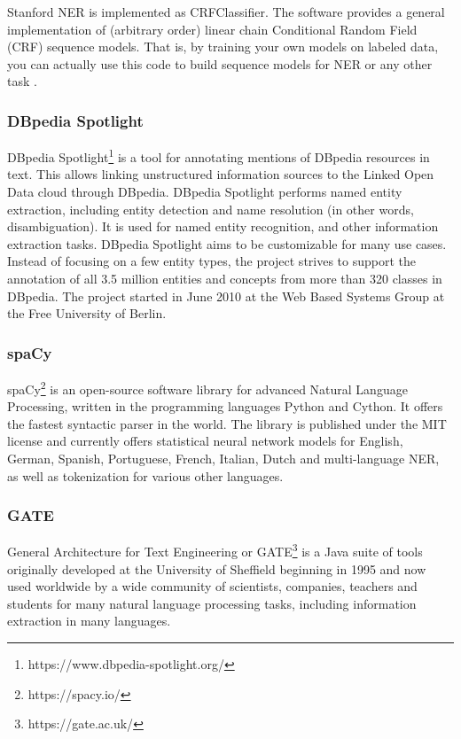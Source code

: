 \documentclass[thesis=M,english]{FITthesis}[2018/05/30]
\begin{document}
Stanford NER is implemented as CRFClassifier. The software provides a general implementation of (arbitrary order) linear chain Conditional Random Field (CRF) sequence models. That is, by training your own models on labeled data, you can actually use this code to build sequence models for NER or any other task \cite{article:StanfordNER}.

\subsubsection{DBpedia Spotlight}\label{DBpedia Spotlight}
DBpedia Spotlight\footnote{https://www.dbpedia-spotlight.org/} \cite{wiki:DBpediaSpotlight} is a tool for annotating mentions of DBpedia resources in text. This allows linking unstructured information sources to the Linked Open Data cloud through DBpedia. DBpedia Spotlight performs named entity extraction, including entity detection and name resolution (in other words, disambiguation). It is used for named entity recognition, and other information extraction tasks. DBpedia Spotlight aims to be customizable for many use cases. Instead of focusing on a few entity types, the project strives to support the annotation of all 3.5 million entities and concepts from more than 320 classes in DBpedia. The project started in June 2010 at the Web Based Systems Group at the Free University of Berlin.

\subsubsection{spaCy}\label{spaCy}
spaCy\footnote{https://spacy.io/} \cite{wiki:spaCy} is an open-source software library for advanced Natural Language Processing, written in the programming languages Python and Cython. It offers the fastest syntactic parser in the world. The library is published under the MIT license and currently offers statistical neural network models for English, German, Spanish, Portuguese, French, Italian, Dutch and multi-language NER, as well as tokenization for various other languages.

\subsubsection{GATE}\label{GATE}
General Architecture for Text Engineering or GATE\footnote{https://gate.ac.uk/} \cite{wiki:GATE} is a Java suite of tools originally developed at the University of Sheffield beginning in 1995 and now used worldwide by a wide community of scientists, companies, teachers and students for many natural language processing tasks, including information extraction in many languages.
\end{document}
